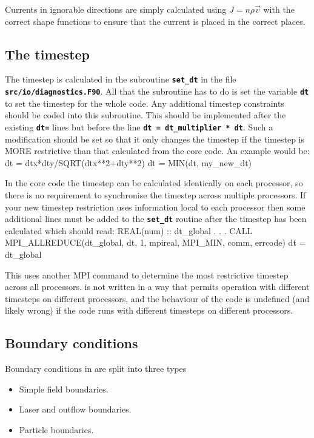 \documentclass[12pt,a4paper]{article}
\newcommand{\inlinecode}[1]{{\color{warwickred} \bf\texttt{#1}}}
\newcommand{\EPOCH}{{\color{warwickdark}\fontfamily{phv}\selectfont{EPOCH}}}
\newenvironment{boxverbatim}{\lboxverbatim{none}}{\endlboxverbatim}
\begin{document}
Currents in ignorable directions are simply calculated using $J = n\rho\vec{v}$
with the correct shape functions to ensure that the current is placed in the
correct places.

\subsection{The timestep}

The timestep is calculated in the subroutine \inlinecode{set\_dt} in the file
\inlinecode{src/io/diagnostics.F90}. All that the subroutine has to do is set
the variable \inlinecode{dt} to set the timestep for the whole code. Any
additional timestep constraints should be coded into this subroutine. This
should be implemented after the existing \inlinecode{dt=} lines but before the
line \inlinecode{dt = dt\_multiplier * dt}. Such a modification should be set so
that it only changes the timestep if the timestep is MORE restrictive than that
calculated from the core code. An example would be:
\begin{boxverbatim}
   dt = dtx*dty/SQRT(dtx**2+dty**2)
   dt = MIN(dt, my_new_dt)
\end{boxverbatim}

In the core {\EPOCH} code the timestep can be calculated identically on each
processor, so there is no requirement to synchronise the timestep across
multiple processors. If your new timestep restriction uses information local to
each processor then some additional lines must be added to the
\inlinecode{set\_dt} routine after the timestep has been calculated which
should read:
\begin{boxverbatim}
  REAL(num) :: dt_global
          .
          .
          .
  CALL MPI_ALLREDUCE(dt_global, dt, 1, mpireal, MPI_MIN, comm, errcode)
  dt = dt_global
\end{boxverbatim}

This uses another MPI command to determine the most restrictive timestep across
all processors. {\EPOCH} is not written in a way that permits operation with
different timesteps on different processors, and the behaviour of the code is
undefined (and likely wrong) if the code runs with different timesteps on
different processors.

\subsection{Boundary conditions}
\label{sec:bcs}
Boundary conditions in {\EPOCH} are split into three types
\begin{itemize}
\item Simple field boundaries.
\item Laser and outflow boundaries.
\item Particle boundaries.
\end{itemize}
\end{document}
